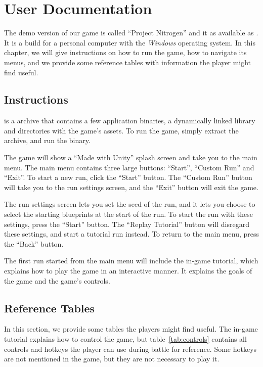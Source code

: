 \chapter{User Documentation}

The demo version of our game is called \enquote{Project Nitrogen} and it as available as .
It is a build for a personal computer with the \emph{Windows} operating system.
In this chapter, we will give instructions on how to run the game, how to navigate its menus, and we provide some reference tables with information the player might find useful.

\section{Instructions}

 is a  archive that contains a few application binaries, a dynamically linked library and directories with the game's assets.
To run the game, simply extract the archive, and run the  binary.

The game will show a \enquote{Made with Unity} splash screen and take you to the main menu.
The main menu contains three large buttons: \enquote{Start}, \enquote{Custom Run} and  \enquote{Exit}.
To start a new run, click the \enquote{Start} button.
The \enquote{Custom Run} button will take you to the run settings screen, and the \enquote{Exit} button will exit the game.

The run settings screen lets you set the seed of the run, and it lets you choose to select the starting blueprints at the start of the run.
To start the run with these settings, press the \enquote{Start} button.
The \enquote{Replay Tutorial} button will disregard these settings, and start a tutorial run instead.
To return to the main menu, press the \enquote{Back} button.

The first run started from the main menu will include the in-game tutorial, which explains how to play the game in an interactive manner.
It explains the goals of the game and the game's controls.

\section{Reference Tables}

In this section, we provide some tables the players might find useful.
The in-game tutorial explains how to control the game, but table~\ref{tab:controls} contains all controls and hotkeys the player can use during battle for reference.
Some hotkeys are not mentioned in the game, but they are not necessary to play it.

